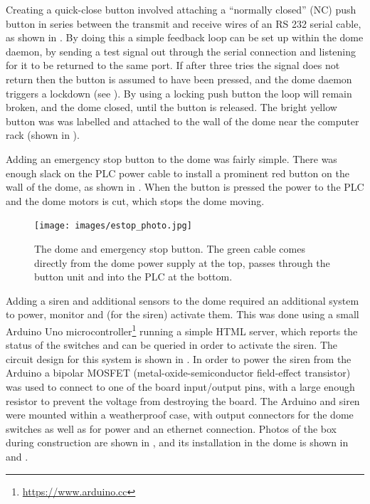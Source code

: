 \begin{colsection}
Creating a quick-close button involved attaching a ``normally closed'' (NC) push button in series between the transmit and receive wires of an RS 232 serial cable, as shown in . By doing this a simple feedback loop can be set up within the dome daemon, by sending a test signal out through the serial connection and listening for it to be returned to the same port. If after three tries the signal does not return then the button is assumed to have been pressed, and the dome daemon triggers a lockdown (see ). By using a locking push button the loop will remain broken, and the dome closed, until the button is released. The bright yellow button was was labelled and attached to the wall of the dome near the computer rack (shown in ).

Adding an emergency stop button to the dome was fairly simple. There was enough slack on the PLC power cable to install a prominent red button on the wall of the dome, as shown in . When the button is pressed the power to the PLC and the dome motors is cut, which stops the dome moving.

\begin{figure}[p]
    \begin{center}
        \texttt{[image: images/estop\_photo.jpg]}
    \end{center}
    \caption[The dome PLC and emergency stop button]{
        The dome  and emergency stop button. The green cable comes directly from the dome power supply at the top, passes through the button unit and into the PLC at the bottom.
    }\label{fig:estop_plc}
\end{figure}

\newpage

Adding a siren and additional sensors to the dome required an additional system to power, monitor and (for the siren) activate them. This was done using a small Arduino Uno microcontroller\footnote{\url{https://www.arduino.cc}} running a simple HTML server, which reports the status of the switches and can be queried in order to activate the siren. The circuit design for this system is shown in . In order to power the siren from the Arduino a bipolar MOSFET (metal-oxide-semiconductor field-effect transistor) was used to connect to one of the board input/output pins, with a large enough resistor to prevent the voltage from destroying the board. The Arduino and siren were mounted within a weatherproof case, with output connectors for the dome switches as well as for power and an ethernet connection. Photos of the box during construction are shown in , and its installation in the dome is shown in  and .


\end{colsection}
